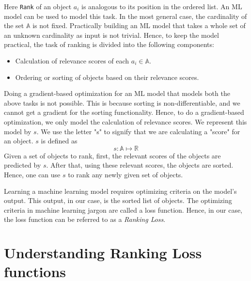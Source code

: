 \documentclass[12pt, twoside, ngerman]{report}
\begin{document}
Here \texttt{Rank} of an object $a_i$ is analogous to its position in the ordered list.
An ML model can be used to model this task.
In the most general case, the cardinality of the set $\mathbb{A}$ is not fixed.
Practically building an ML model that takes a whole set of an unknown cardinality as input is not trivial.
Hence, to keep the model practical, the task of ranking is divided into the following components:~\cite{procedureforrankinginintro}
\begin{itemize}
\item Calculation of relevance scores of each $a_i \in \mathbb{A}$.
\item Ordering or sorting of objects based on their relevance scores. 
\end{itemize}

Doing a gradient-based optimization for an ML model that models both the above tasks is not possible.
This is because sorting is non-differentiable, and we cannot get a gradient for the sorting functionality.
Hence, to do a gradient-based optimization, we only model the calculation of relevance scores.
We represent this model by $s$.
We use the letter "s" to signify that we are calculating a "score" for an object. $s$ is defined as
$$
s : \mathbb{A} \mapsto \mathbb{R}
$$
Given a set of objects to rank, first, the relevant scores of the objects are predicted by $s$. After that, using these relevant scores,  the objects are sorted.
Hence, one can use $s$ to rank any newly given set of objects.

Learning a machine learning model requires optimizing criteria on the model's output.
This output, in our case, is the sorted list of objects.
The optimizing criteria in machine learning jargon are called a loss function.
Hence,  in our case, the loss function can be referred to as a \textit{Ranking Loss}.

\section{Understanding Ranking Loss functions}

\end{document}
